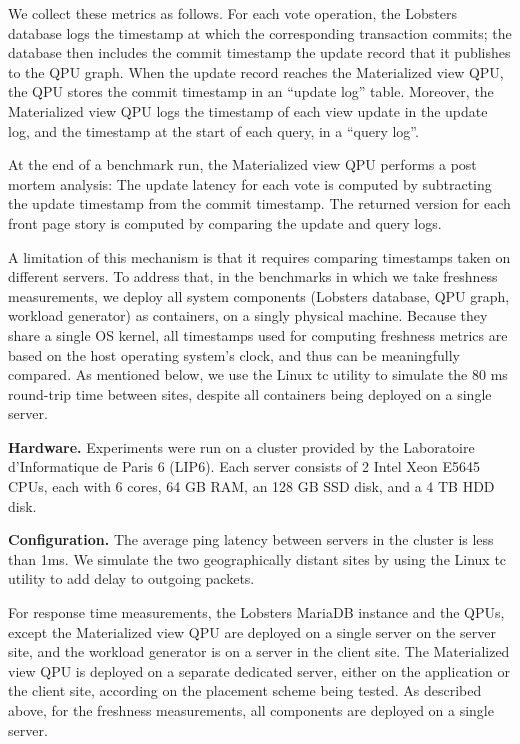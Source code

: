 We collect these metrics as follows.
For each vote operation, the Lobsters database logs the timestamp at which the corresponding transaction commits;
the database then includes the commit timestamp the update record that it publishes to the QPU graph.
When the update record reaches the Materialized view QPU, the QPU stores the commit timestamp in an
``update log'' table.
Moreover, the Materialized view QPU logs the timestamp of each view update in the update log,
and the timestamp at the start of each query, in a ``query log''.

At the end of a benchmark run, the Materialized view QPU performs a post mortem analysis:
The update latency for each vote is computed by subtracting the update timestamp from the commit timestamp.
The returned version for each front page story is computed by comparing the update and query logs.

A limitation of this mechanism is that it requires comparing timestamps taken on different servers.
To address that, in the benchmarks in which we take freshness measurements,
we deploy all system components (Lobsters database, QPU graph, workload generator) as containers,
on a singly physical machine.
Because they share a single OS kernel, all timestamps used for computing freshness metrics are based
on the host operating system's clock, and thus can be meaningfully compared.
As mentioned below, we use the Linux tc utility \cite{tc} to simulate the 80 ms round-trip time between sites,
despite all containers being deployed on a single server.

\bigskip
\noindent
\textbf{Hardware.}
Experiments were run on a cluster provided by the Laboratoire d'Informatique de Paris 6 (LIP6).
Each server consists of 2 Intel Xeon E5645 CPUs, each with 6 cores, 64 GB RAM, an 128 GB SSD disk, and a 4 TB HDD disk.

\bigskip
\noindent
\textbf{Configuration.}
The average ping latency between servers in the cluster is less than 1ms.
We simulate the two geographically distant sites by using the Linux tc utility \cite{tc} to add delay to outgoing packets.

For response time measurements, the Lobsters MariaDB instance and the QPUs, except the Materialized view QPU are deployed
on a single server on the server site, and the workload generator is on a server in the client site.
The Materialized view QPU is deployed on a separate dedicated server, either on the application or the client site,
according on the placement scheme being tested.
As described above, for the freshness measurements, all components are deployed on a single server.

